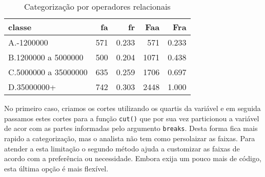 \documentclass[12pt,]{style/krantz}
\makeatletter
\newenvironment{Shaded}{\begin{snugshade}}{\end{snugshade}}
\newcommand{\DataTypeTok}[1]{\textcolor[rgb]{0.13,0.29,0.53}{#1}}
\newcommand{\DecValTok}[1]{\textcolor[rgb]{0.00,0.00,0.81}{#1}}
\newcommand{\KeywordTok}[1]{\textcolor[rgb]{0.13,0.29,0.53}{\textbf{#1}}}
\newcommand{\NormalTok}[1]{#1}
\newcommand{\OperatorTok}[1]{\textcolor[rgb]{0.81,0.36,0.00}{\textbf{#1}}}
\newcommand{\OtherTok}[1]{\textcolor[rgb]{0.56,0.35,0.01}{#1}}
\newcommand{\StringTok}[1]{\textcolor[rgb]{0.31,0.60,0.02}{#1}}
\newenvironment{kframe}{%
\medskip{}
\setlength{\fboxsep}{.8em}
 \def\at@end@of@kframe{}%
 \ifinner\ifhmode%
  \def\at@end@of@kframe{\end{minipage}}%
  \begin{minipage}{\columnwidth}%
 \fi\fi%
 \def\FrameCommand##1{\hskip\@totalleftmargin \hskip-\fboxsep
 \colorbox{shadecolor}{##1}\hskip-\fboxsep
     \hskip-\linewidth \hskip-\@totalleftmargin \hskip\columnwidth}%
 \MakeFramed {\advance\hsize-\width
   \@totalleftmargin\z@ \linewidth\hsize
   \@setminipage}}%
 {\par\unskip\endMakeFramed%
 \at@end@of@kframe}
\renewenvironment{Shaded}{\begin{kframe}}{\end{kframe}}
\theoremstyle{definition}
\theoremstyle{definition}
\theoremstyle{definition}
\theoremstyle{remark}
\makeatother
\begin{document}
\begin{Shaded}
\end{Shaded}

\begin{table}[!h]

\caption{\label{tab:tab09}Categorização por operadores relacionais}
\centering
\begin{tabular}{lrrrr}
\toprule
classe & fa & fr & Faa & Fra\\
\midrule
A.-1200000 & 571 & 0.233 & 571 & 0.233\\
B.1200000 a 5000000 & 500 & 0.204 & 1071 & 0.438\\
C.5000000 a 35000000 & 635 & 0.259 & 1706 & 0.697\\
D.35000000+ & 742 & 0.303 & 2448 & 1.000\\
\bottomrule
\end{tabular}
\end{table}

No primeiro caso, criamos os cortes utilizando os quartis da variável e em seguida passamos estes cortes para a função \texttt{cut()} que por sua vez particionou a variável de acor com as partes informadas pelo argumento \texttt{breaks}. Desta forma fica mais rapido a categorização, mas o analista não tem como persolaizar as faixas. Para atender a esta limitação o segundo método ajuda a customizar as faixas de acordo com a preferência ou necessidade. Embora exija um pouco mais de código, esta última opção é mais flexível.
\end{document}
